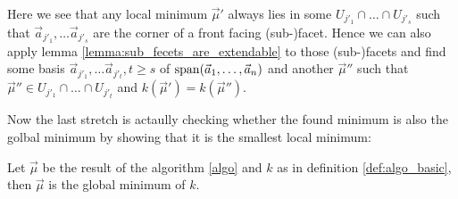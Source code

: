 \begin{observation}
    \label{obs:local_minima_in_front_facets}
    Here we see that any local minimum $\vec\mu'$ always lies in some $U_{j'_1} \cap \dots \cap U_{j'_s}$ such that $\vec a_{j'_1}, \dots \vec a_{j'_s}$ are the corner of a front facing (sub-)facet. Hence we can also apply lemma \ref{lemma:sub_fecets_are_extendable} to those (sub-)facets and find some basis $\vec a_{j'_1}, \dots \vec a_{j'_t}, t \geq s$ of $\operatorname{span}(\vec a_1, \dots, \vec a_n)$ and another $\vec\mu''$ such that $\vec\mu'' \in U_{j'_1} \cap \dots \cap U_{j'_t}$ and $k(\vec\mu') = k(\vec\mu'')$.
\end{observation}


Now the last stretch is actaully checking whether the found minimum is also the golbal minimum by showing that it is the smallest local minimum:
\begin{theorem}
    Let $\vec\mu$ be the result of the algorithm \ref{algo} and $k$ as in definition \ref{def:algo_basic}, then $\vec\mu$ is the global minimum of $k$.
\end{theorem}
